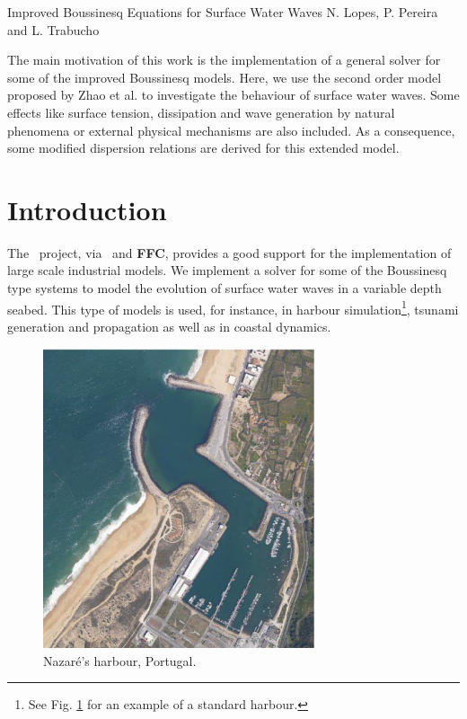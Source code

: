 \def\bu{{\bf u}}
\def\bx{{\bf x}}
\def\fba{\vartheta_1}
\def\fbb{\vartheta_2}
\def\bn{{\bf n}}
\def\bomega{{\bf  \omega}}
\def\dx{{\rm d}x}
\def\dy{{\rm d}y}
\def\dt{{\rm d}t}
\def\ds{{\rm d}s}
\newcommand{\fpar}[2]{\frac{\partial #1}{\partial #2}}
\newcommand{\grad}[1]{\nabla{#1}}
\newcommand{\diverg}[1]{\nabla\cdot{#1}}

              {Improved Boussinesq Equations for Surface Water Waves}
              {N. Lopes, P. Pereira and L. Trabucho}


The main motivation  of this work is the
implementation of a general solver for some of the improved Boussinesq
models.
Here, we use  the second order model proposed
by Zhao et al.  \cite{ZhaTen04} to investigate the behaviour
of surface water waves.
Some effects like surface tension, dissipation and
wave generation by natural phenomena or external physical mechanisms are also included.
 As a consequence, some modified
dispersion relations are derived for this extended model.



\section{Introduction}
The \fenics\, project, via \dolfin\,  and \textbf{FFC}, provides a good
support for the implementation of large scale
industrial models.  We  implement  a solver for some of the
 Boussinesq type systems to model the evolution of
surface water waves in a variable depth seabed. 
This type of models is used, for instance, in harbour
simulation\footnote{See Fig. \ref{fig::harbour} for an
example of a standard harbour.},
tsunami generation and propagation as well as in coastal dynamics.
\begin{figure}[!htb]
\centering
\includegraphics[width=8cm]{chapters/lopes/eps/nazare1.eps}
\caption{Nazar\'{e}'s harbour, Portugal.}\label{fig::harbour}
\end{figure}

